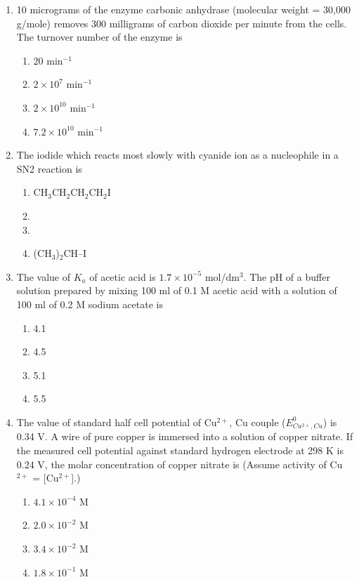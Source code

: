\documentclass[journal,12pt,onecolumn]{IEEEtran}
\begin{document}
\begin{enumerate}[label=\arabic*.]
\item 10 micrograms of the enzyme carbonic anhydrase (molecular weight = 30,000 g/mole) removes 300 milligrams of carbon dioxide per minute from the cells. The turnover number of the enzyme is
\begin{multicols}{2}
\begin{enumerate}[label=(\Alph*)]
\item $20$ min$^{-1}$
\item $2 \times 10^{7}$ min$^{-1}$
\item $2 \times 10^{10}$ min$^{-1}$
\item $7.2 \times 10^{10}$ min$^{-1}$
\end{enumerate}
\end{multicols}

\item The iodide which reacts most slowly with cyanide ion as a nucleophile in a SN2 reaction is

\begin{multicols}{2}
\begin{enumerate}[label=(\Alph*)]
\item CH$_3$CH$_2$CH$_2$CH$_2$I
\item {}
\item {}
\item (CH$_3$)$_2$CH–I
\end{enumerate}
\end{multicols}

\item The value of $K_a$ of acetic acid is $1.7 \times 10^{-5}$ mol/dm$^3$. The pH of a buffer solution prepared by mixing 100 ml of 0.1 M acetic acid with a solution of 100 ml of 0.2 M sodium acetate is
\begin{multicols}{2}
\begin{enumerate}[label=(\Alph*)]
\item 4.1
\item 4.5
\item 5.1
\item 5.5
\end{enumerate}
\end{multicols}

\item The value of standard half cell potential of Cu$^{2+}$, Cu couple ($E^0_{Cu^{2+}, Cu}$) is 0.34 V. A wire of pure copper is immersed into a solution of copper nitrate. If the measured cell potential against standard hydrogen electrode at 298 K is 0.24 V, the molar concentration of copper nitrate is (Assume activity of Cu$^{2+}$ = [Cu$^{2+}$].)
\begin{multicols}{2}
\begin{enumerate}[label=(\Alph*)]
\item $4.1 \times 10^{-4}$ M
\item $2.0 \times 10^{-2}$ M
\item $3.4 \times 10^{-2}$ M
\item $1.8 \times 10^{-1}$ M
\end{enumerate}
\end{multicols}


\end{enumerate}
\end{document}
